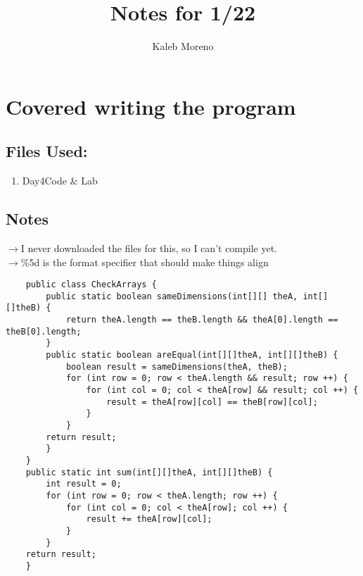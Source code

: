 \documentclass{article}
\begin{document}
\title{Notes for 1/22}
\author{Kaleb Moreno}
\maketitle

\section{Covered writing the program }

\subsection{Files Used:}

\begin{enumerate}
\item{Day4Code \& Lab} 
\end{enumerate}

\subsection{Notes}
$\rightarrow$I never downloaded the files for this, so I can't compile yet. \\

$\rightarrow$\%5d is the format specifier that should make things align
\begin{lstlisting}
    public class CheckArrays {
        public static boolean sameDimensions(int[][] theA, int[][]theB) {
            return theA.length == theB.length && theA[0].length == theB[0].length;
        }
        public static boolean areEqual(int[][]theA, int[][]theB) {
            boolean result = sameDimensions(theA, theB);
            for (int row = 0; row < theA.length && result; row ++) {
                for (int col = 0; col < theA[row] && result; col ++) {
                    result = theA[row][col] == theB[row][col];
                }
            }
        return result;
        }
    }
    public static int sum(int[][]theA, int[][]theB) {
        int result = 0;
        for (int row = 0; row < theA.length; row ++) {
            for (int col = 0; col < theA[row]; col ++) {
                result += theA[row][col];
            }
        }
    return result;
    }
\end{lstlisting}
\end{document}
